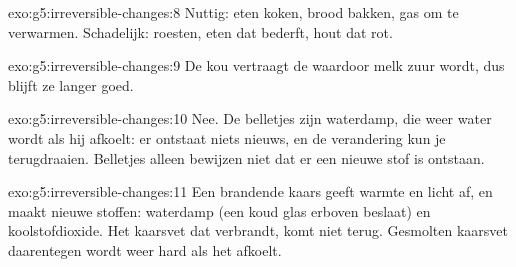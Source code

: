 \begin{solution}{exo:g5:irreversible-changes:8}
Nuttig: eten koken, brood bakken, gas  om te verwarmen.
Schadelijk: roesten, eten dat bederft, hout dat rot.
\end{solution}

\begin{solution}{exo:g5:irreversible-changes:9}
De kou vertraagt de  waardoor melk zuur wordt,
dus blijft ze langer goed.
\end{solution}

\begin{solution}{exo:g5:irreversible-changes:10}
Nee. De belletjes zijn waterdamp, die weer water wordt als hij afkoelt:
er ontstaat niets nieuws, en de verandering kun je terugdraaien.
Belletjes alleen bewijzen niet dat er een nieuwe stof is ontstaan.
\end{solution}

\begin{solution}{exo:g5:irreversible-changes:11}
Een brandende kaars geeft warmte en licht af, en maakt nieuwe stoffen:
waterdamp (een koud glas erboven beslaat) en koolstofdioxide. Het
kaarsvet dat verbrandt, komt niet terug. Gesmolten kaarsvet daarentegen
wordt weer hard als het afkoelt.
\end{solution}
